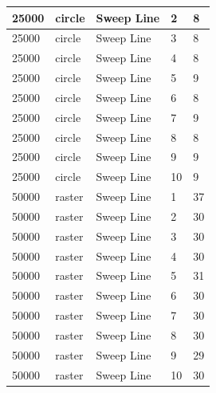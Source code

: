 \documentclass[12pt]{article}
\begin{document}
\begin{longtable}{|l|l|l|l|l|}
25000        & circle            & Sweep Line & 2          & 8                             \\ \hline
25000        & circle            & Sweep Line & 3          & 8                             \\ \hline
25000        & circle            & Sweep Line & 4          & 8                             \\ \hline
25000        & circle            & Sweep Line & 5          & 9                             \\ \hline
25000        & circle            & Sweep Line & 6          & 8                             \\ \hline
25000        & circle            & Sweep Line & 7          & 9                             \\ \hline
25000        & circle            & Sweep Line & 8          & 8                             \\ \hline
25000        & circle            & Sweep Line & 9          & 9                             \\ \hline
25000        & circle            & Sweep Line & 10         & 9                             \\ \hline
50000        & raster            & Sweep Line & 1          & 37                            \\ \hline
50000        & raster            & Sweep Line & 2          & 30                            \\ \hline
50000        & raster            & Sweep Line & 3          & 30                            \\ \hline
50000        & raster            & Sweep Line & 4          & 30                            \\ \hline
50000        & raster            & Sweep Line & 5          & 31                            \\ \hline
50000        & raster            & Sweep Line & 6          & 30                            \\ \hline
50000        & raster            & Sweep Line & 7          & 30                            \\ \hline
50000        & raster            & Sweep Line & 8          & 30                            \\ \hline
50000        & raster            & Sweep Line & 9          & 29                            \\ \hline
50000        & raster            & Sweep Line & 10         & 30                            \\ \hline

\end{longtable}
\end{document}
